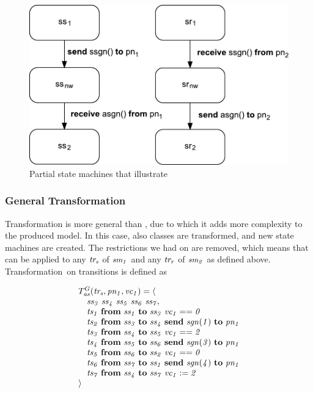 \begin{figure}[hbt]
  \centering
  \includegraphics[scale=0.45]{reusable-correct-transformations/figs/transformation_simple}
  \caption{Partial state machines that illustrate \TSim}
  \label{fig:reusable-correct-transformations:trans_simple}
\end{figure}

\subsubsection{General Transformation}
Transformation \TGen is more general than \TSim, due to which it adds more complexity to the produced model.
In this case, also classes are transformed, and new state machines are created.
The restrictions we had on \TSim are removed, which means that \TGen can be applied to any $\it{tr_s}$ of $\it{sm_1}$ and any $\it{tr_r}$ of $\it{sm_2}$ as defined above.
Transformation~\TGen on transitions is defined as

\[
\begin{array}{l}
T^G_{\it{as}}(\it{tr_s}, \it{pn_1}, \it{vc_1}) = \langle \\
\quad \it{ss_3}~\it{ss_4}~\it{ss_5}~\it{ss_6}~\it{ss_7}, \\
\quad \it{ts_1}~\textbf{from}~\it{ss_1}~\textbf{to}~\it{ss_3}~\it{vc_1}==0 \\
\quad \it{ts_2}~\textbf{from}~\it{ss_3}~\textbf{to}~\it{ss_4}~\textbf{send}~\it{sgn}(1)~\textbf{to}~\it{pn_1} \\
\quad \it{ts_3}~\textbf{from}~\it{ss_4}~\textbf{to}~\it{ss_5}~\it{vc_1}==2 \\
\quad \it{ts_4}~\textbf{from}~\it{ss_5}~\textbf{to}~\it{ss_6}~\textbf{send}~\it{sgn}(3)~\textbf{to}~\it{pn_1} \\
\quad \it{ts_5}~\textbf{from}~\it{ss_6}~\textbf{to}~\it{ss_2}~\it{vc_1}==0 \\
\quad \it{ts_6}~\textbf{from}~\it{ss_7}~\textbf{to}~\it{ss_1}~\textbf{send}~\it{sgn}(4)~\textbf{to}~\it{pn_1} \\
\quad \it{ts_7}~\textbf{from}~\it{ss_4}~\textbf{to}~\it{ss_7}~\it{vc_1}:=2 \\
\rangle
\end{array}
\]

